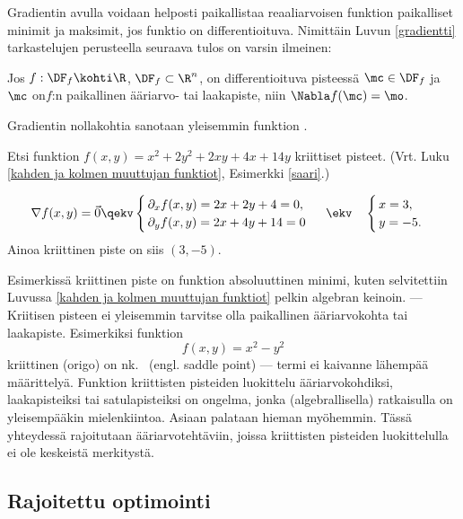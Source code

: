 Gradientin avulla voidaan helposti paikallistaa reaaliarvoisen funktion paikalliset minimit ja 
maksimit, jos funktio on differentioituva. Nimittäin Luvun \ref{gradientti} tarkastelujen 
perusteella seuraava tulos on varsin ilmeinen:
\begin{Prop} \label{ääriarvopropositio-Rn}
Jos $f:\DF_f\kohti\R$, $\DF_f\subset\R^n$, on differentioituva pisteessä $\mc\in\DF_f$ ja $\mc$
on$f$:n paikallinen ääriarvo- tai laakapiste, niin $\Nabla f(\mc)=\mo$.
\end{Prop}
%
Gradientin nollakohtia sanotaan yleisemmin funktion .
\begin{Exa} \label{saari uudelleen}
Etsi funktion $f(x,y)=x^2+2y^2+2xy+4x+14y$ kriittiset pisteet. 
(Vrt. Luku \ref{kahden ja kolmen muuttujan funktiot}, Esimerkki \ref{saari}.)
\end{Exa} 
\ratk 
\[
\nabla f(x,y)=\vec 0 \qekv \begin{cases} 
                           \,\partial_x f(x,y)= 2x+2y+4=0, \\ 
                           \,\partial_y f(x,y)= 2x+4y+14=0 
                           \end{cases}\ \ekv \quad \begin{cases} \,x=3, \\ \,y=-5. \end{cases}
\]
Ainoa kriittinen piste on siis $(3,-5)$. \loppu

Esimerkissä kriittinen piste on funktion absoluuttinen minimi, kuten selvitettiin Luvussa 
\ref{kahden ja kolmen muuttujan funktiot} pelkin algebran keinoin. --- Kriitisen pisteen
ei yleisemmin tarvitse olla paikallinen ääriarvokohta tai laakapiste. Esimerkiksi funktion
\[
f(x,y)=x^2-y^2
\]
%
kriittinen (origo) on nk.\  (engl. saddle point) --- termi ei kaivanne
lähempää määrittelyä. Funktion kriittisten pisteiden luokittelu ääriarvokohdiksi,
laakapisteiksi tai satulapisteiksi on ongelma, jonka (algebrallisella) ratkaisulla on
yleisempääkin mielenkiintoa. Asiaan palataan hieman myöhemmin. Tässä yhteydessä rajoitutaan
ääriarvotehtäviin, joissa kriittisten pisteiden luokittelulla ei ole keskeistä merkitystä.

\subsection*{Rajoitettu optimointi} 

